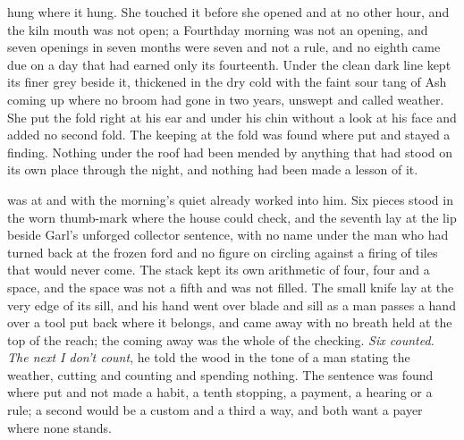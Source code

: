  hung where it hung. She touched it before she opened  and at no other hour, and the kiln mouth was not open; a Fourthday morning was not an opening, and seven openings in seven months were seven and not a rule, and no eighth came due on a day that had earned only its fourteenth. Under  the clean dark line kept its finer grey beside it, thickened in the dry cold with the faint sour tang of Ash coming up where no broom had gone in two years, unswept and called weather. She put the fold right at his ear and under his chin without a look at his face and added no second fold. The keeping at the fold was found where put and stayed a finding. Nothing under the roof had been mended by anything that had stood on its own place through the night, and nothing had been made a lesson of it.

\scenebreak

 was at  and  with the morning's quiet already worked into him. Six pieces stood in the worn thumb-mark where the house could check, and the seventh lay at the lip beside Garl's unforged collector sentence, with no name under the man who had turned back at the frozen ford and no figure on  circling against a firing of tiles that would never come. The stack kept its own arithmetic of four, four and a space, and the space was not a fifth and was not filled. The small knife lay at the very edge of its sill, and his hand went over blade and sill as a man passes a hand over a tool put back where it belongs, and came away with no breath held at the top of the reach; the coming away was the whole of the checking. \emph{Six counted. The next I don't count}, he told the wood in the tone of a man stating the weather, cutting and counting and spending nothing. The sentence was found where put and not made a habit, a tenth stopping, a payment, a hearing or a rule; a second would be a custom and a third a way, and both want a payer where none stands.

